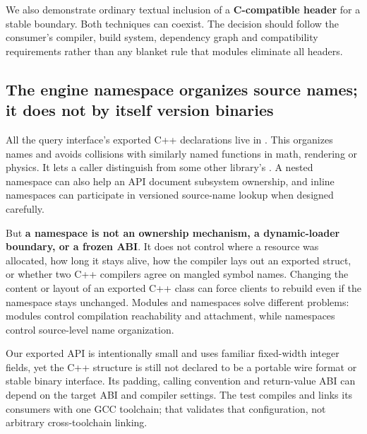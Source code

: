 We also demonstrate ordinary textual inclusion of a \textbf{C-compatible header} for a stable boundary. Both techniques can coexist. The decision should follow the consumer's compiler, build system, dependency graph and compatibility requirements rather than any blanket rule that modules eliminate all headers.

\subsection{The engine namespace organizes source names; it does not by itself version binaries}\label{05-engine-i-ch006-the-engine-namespace-organizes-source-names-it-does-not-by-itself-version-binaries}

\hypertarget{05-engine-i-ch006-the-engine-namespace-organizes-source-names-it-does-not-by-itself-version-binaries}{}

All the query interface's exported C++ declarations live in . This organizes names and avoids collisions with similarly named functions in math, rendering or physics. It lets a caller distinguish  from some other library's . A nested namespace can also help an API document subsystem ownership, and inline namespaces can participate in versioned source-name lookup when designed carefully.

But \textbf{a namespace is not an ownership mechanism, a dynamic-loader boundary, or a frozen ABI}. It does not control where a resource was allocated, how long it stays alive, how the compiler lays out an exported struct, or whether two C++ compilers agree on mangled symbol names. Changing the content or layout of an exported C++ class can force clients to rebuild even if the namespace stays unchanged. Modules and namespaces solve different problems: modules control compilation reachability and attachment, while namespaces control source-level name organization.

Our exported API is intentionally small and uses familiar fixed-width integer fields, yet the C++  structure is still not declared to be a portable wire format or stable binary interface. Its padding, calling convention and return-value ABI can depend on the target ABI and compiler settings. The test compiles and links its consumers with one GCC toolchain; that validates that configuration, not arbitrary cross-toolchain linking.

